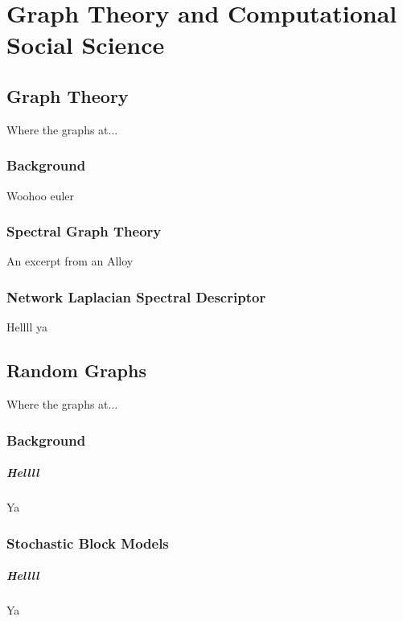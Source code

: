 \chapter{Graph Theory and Computational Social Science}\label{ch:GraphTheory}

\section{Graph Theory}\label{sec:GraphTheory}
    Where the graphs at...

\subsection{Background}\label{sec:graphTheoryBackground}

    Woohoo euler

\subsection{Spectral Graph Theory}\label{sec:spectralGraphTheory}

    An excerpt from an Alloy
    
 \subsection{Network Laplacian Spectral Descriptor}\label{sec:NetLSD}

Hellll ya
 
\section{Random Graphs}\label{sec:RandomGraphs}

    Where the graphs at...
    
\subsection{Background}\label{sec:RandomGraphBackground}

\paragraph{Hellll}
	Ya
	
\subsection{Stochastic Block Models}\label{sec:SBM}

\paragraph{Hellll}
	Ya
	
